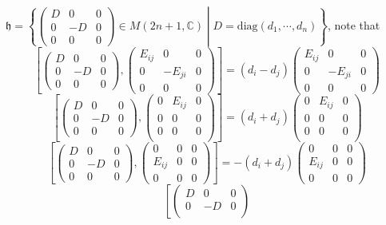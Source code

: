 \documentclass[main]{subfiles}
\begin{document}
$\mathfrak{h}=\left\{\begin{pmatrix}
D&0&0 \\
0&-D&0 \\
0&0&0
\end{pmatrix}\in M(2n+1,\mathbb C)\middle| D=\mathrm{diag}(d_1,\cdots,d_n)\right\}$, note that $$\left[\begin{pmatrix}
D&0&0 \\
0&-D&0 \\
0&0&0
\end{pmatrix},\begin{pmatrix}
E_{ij}&0&0 \\
0&-E_{ji}&0 \\
0&0&0
\end{pmatrix}\right]=(d_i-d_j)\begin{pmatrix}
E_{ij}&0&0 \\
0&-E_{ji}&0 \\
0&0&0
\end{pmatrix}$$ $$\left[\begin{pmatrix}
D&0&0 \\
0&-D&0 \\
0&0&0
\end{pmatrix},\begin{pmatrix}
0&E_{ij}&0 \\
0&0&0 \\
0&0&0 \\
\end{pmatrix}\right]=(d_i+d_j)\begin{pmatrix}
0&E_{ij}&0 \\
0&0&0 \\
0&0&0 \\
\end{pmatrix}$$ $$\left[\begin{pmatrix}
D&0&0 \\
0&-D&0 \\
0&0&0
\end{pmatrix},\begin{pmatrix}
0&0&0 \\
E_{ij}&0&0 \\
0&0&0
\end{pmatrix}\right]=-(d_i+d_j)\begin{pmatrix}
0&0&0 \\
E_{ij}&0&0 \\
0&0&0
\end{pmatrix}$$ $$\left[\begin{pmatrix}
D&0&0 \\
0&-D&0 \\

\end{pmatrix}$$
\end{document}
